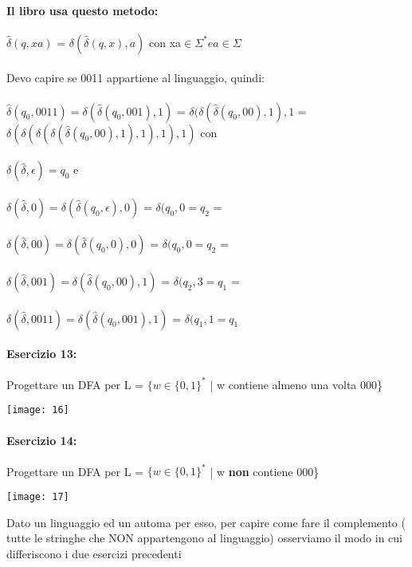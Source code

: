 \documentclass[12pt, a4paper, openany, oneside]{book}
\begin{document}
\paragraph{Il libro usa questo metodo: }
$\widehat{\delta}(q,xa)$ = $\delta(\widehat{\delta}(q,x),a)$ 
 con xa$\in \Sigma^{*} e a \in \Sigma$
\\ \\ 
Devo capire se 0011 appartiene al linguaggio, quindi: \\ \\
$\widehat{\delta}(q_{0},0011) = \delta(\widehat{\delta}(q_{0},001),1)$ =
$\delta(\delta(\widehat{\delta}(q_{0},00),1),1$ =  
$\delta(\delta(\delta(\delta(\widehat{\delta}(q_{0},00),1),1),1),1)$ con \\ \\
$\delta(\widehat{\delta}, \epsilon) = q_{0}$ e \\ \\
$\delta(\widehat{\delta},0) = \delta(\widehat{\delta}(q_{0},\epsilon),0)$ =
$\delta(q_{0},0 = q_{2}$ =\\ \\
$\delta(\widehat{\delta},00) = \delta(\widehat{\delta}(q_{0},0),0)$ =
$\delta(q_{0},0 = q_{2}$ = \\ \\
$\delta(\widehat{\delta},001) = \delta(\widehat{\delta}(q_{0},00),1)$ =
$\delta(q_{2},3 = q_{1}$ = \\ \\
$\delta(\widehat{\delta},0011) = \delta(\widehat{\delta}(q_{0},001),1)$ =
$\delta(q_{1},1 = q_{1}$
\paragraph{Esercizio 13: }
Progettare un DFA per L = $\{w \in \{0,1\}^{*}$ | w contiene almeno una volta
000\}
\begin{center}
\texttt{[image: 16]}
\end{center}
\paragraph{Esercizio 14: }
Progettare un DFA per L = $\{w \in \{0,1\}^{*}$ | w \textbf{non} contiene
000\}
\begin{center}
\texttt{[image: 17]}
\end{center}
Dato un linguaggio ed un automa per esso, per capire come fare il complemento (
tutte le stringhe che NON appartengono al linguaggio) osserviamo il modo in cui
differiscono i due esercizi precedenti 
\end{document}
